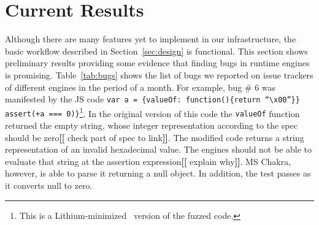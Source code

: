 \documentclass[11pt]{article}
\newcommand{\Fix}[1]{\textbf{[[}{\color{red} #1}\textbf{]]}}
\newcommand{\Mar}[1]{\textbf{[[}{\color{blue} #1}\textbf{]]}}
\newcommand{\MAB}[1]{\textbf{[[}{\color{darkgreen} #1}\textbf{]]}}
\newcommand{\CodeIn}[1]{{\small\texttt{#1}}}
\begin{document}

\section{Current Results}
\label{sec:results}

Although there are many features yet to implement in our
infrastructure, the basic workflow described in
Section~\ref{sec:design} is functional. This section shows preliminary
results providing some evidence that finding bugs in runtime engines is
promising. Table~\ref{tab:bugs} shows the list of bugs we reported on
issue trackers of different engines in the period of a month. For
example, bug \# 6 was manifested by the JS code \CodeIn{var a =
  \{valueOf:~function()\{return ``\textbackslash{}x00''\}\} assert(+a
  === 0)\}}\footnote{This is a Lithium-minimized~\cite{lithium}
  version of the fuzzed code.}. In the original version of this code the \CodeIn{valueOf} function returned
the empty string, whose integer representation according to the spec
should be zero\Fix{check part of spec to link}. The modified
code returns a string representation of an invalid hexadecimal
value. The engines should not be able to evaluate that string at
the assertion expression\Fix{explain why}. MS Chakra, however, is able to parse it
returning a null object. In addition, the test passes as it converts
null to zero. 
\end{document}
